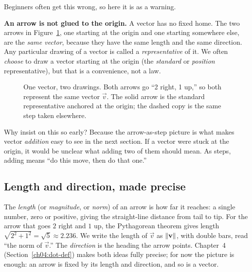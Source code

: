 Beginners often get this wrong, so here it is as a warning.

\begin{trapbox}
\textbf{An arrow is not glued to the origin.} A vector has no fixed home. The two arrows
in Figure~\ref{ch02:fig-translate}, one starting at the origin and one starting somewhere
else, are the \emph{same vector}, because they have the same length and the same
direction. Any particular drawing of a vector is called a \emph{representative} of it. We
often \emph{choose} to draw a vector starting at the origin (the \emph{standard} or
\emph{position} representative), but that is a convenience, not a law.
\end{trapbox}

\begin{figure}[H]
\centering
{}
\caption{One vector, two drawings. Both arrows go ``2 right, 1 up,'' so both represent
the same vector $\vec{v}$. The solid arrow is the standard representative anchored at the
origin; the dashed copy is the same step taken elsewhere.}
\label{ch02:fig-translate}
\end{figure}

Why insist on this so early? Because the arrow-as-step picture is what makes vector
\emph{addition} easy to see in the next section. If a vector were stuck at the origin, it
would be unclear what adding two of them should mean. As steps, adding means ``do this
move, then do that one.''

\subsection*{Length and direction, made precise}

The \emph{length} (or \emph{magnitude}, or \emph{norm}) of an arrow is how far it
reaches: a single number, zero or positive, giving the straight-line distance from tail
to tip. For the arrow that goes $2$ right and $1$ up, the Pythagorean theorem gives
length $\sqrt{2^2 + 1^2} = \sqrt{5} \approx 2.236$. We write the length of $\vec{v}$ as
$\lVert\mathbf{v}\rVert$, with double bars, read ``the norm of $\vec{v}$.'' The
\emph{direction} is the heading the arrow points. Chapter~4
(Section~\ref{ch04:dot-def}) makes both ideas fully precise; for now the picture is
enough: an arrow is fixed by its length and direction, and so is a vector.

